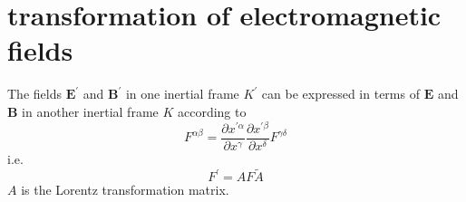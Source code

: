 \documentclass[12pt,a4paper]{article}
\renewcommand{\vec}[1]{\boldsymbol{#1}}
\begin{document}
\section{transformation of electromagnetic fields}
The fields $\vec{E}^{\prime}$ and $\vec{B}^{\prime}$ in one inertial frame $K^{\prime}$ can be  expressed in terms of $\vec{E}$ and $\vec{B}$ in another inertial frame $K$ according to
\begin{equation}
F^{\alpha \beta} = \frac{\partial x^{\prime \alpha}}{\partial x^{\gamma}}  \frac{\partial x^{\prime \beta}}{\partial x^{\delta}} F^{\gamma \delta} 
\end{equation}
i.e.
\begin{equation}
F^{\prime} = A F \tilde{A}
\end{equation}
$A$ is the Lorentz transformation matrix.
\end{document}
